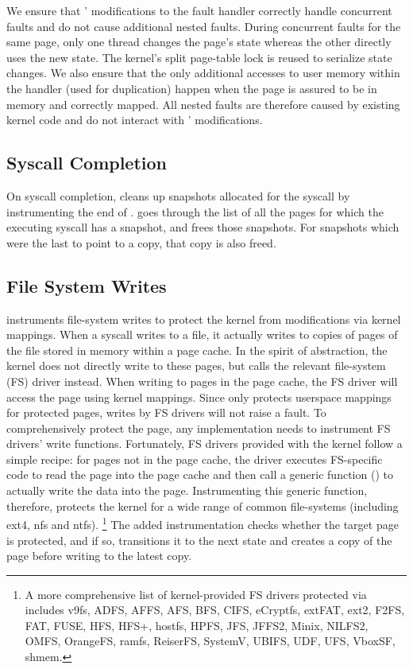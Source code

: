 \documentclass[letterpaper,twocolumn,10pt]{article}
\begin{document}
We ensure that \midas' modifications to the fault handler 
correctly handle concurrent faults and do not cause additional 
nested faults. 
During concurrent faults for the same page, only one thread 
changes the page's state whereas the other directly uses the new 
state.
The kernel's split page-table lock is reused to serialize state 
changes. 
We also ensure that the only additional accesses to user memory 
within the handler (used for duplication) happen when the page 
is assured to be in memory and correctly mapped.
All nested faults are therefore caused by existing kernel code
and do not interact with \midas' modifications.

\subsection{Syscall Completion}

On syscall completion, \midas cleans up snapshots allocated for 
the syscall by instrumenting the end of .
\midas goes through the list of all the pages for which the 
executing syscall has a snapshot, and frees those snapshots.
For snapshots which were the last to point to a copy, that 
copy is also freed.


\subsection{File System Writes}

\midas instruments file-system writes to protect the kernel
from modifications via kernel mappings.
When a  syscall writes to a file, it actually
writes to copies of pages of the file stored in memory within 
a page cache.
In the spirit of abstraction, the kernel does not directly write to 
these pages, but calls the relevant file-system (FS) driver instead.
When writing to pages in the page cache, the FS driver will access the 
page using kernel mappings.
Since \midas only protects userspace mappings for protected pages, 
writes by FS drivers will not raise a fault.
To comprehensively protect the page, any implementation needs to 
instrument FS drivers' write functions.
Fortunately, FS drivers provided with the kernel follow a simple 
recipe: for pages not in the page cache, the driver executes 
FS-specific code to read the page into the page cache and then 
call a generic function () to actually 
write the data into the page.
Instrumenting this generic function, therefore, protects the kernel
for a wide range of common file-systems (including ext4, nfs and 
ntfs). \footnote{A more comprehensive list of kernel-provided FS drivers 
protected via  includes v9fs, ADFS, AFFS, 
AFS, BFS, CIFS, eCryptfs, extFAT, ext2, F2FS,  FAT, FUSE, HFS, HFS+, 
hostfs, HPFS, JFS, JFFS2, Minix, NILFS2, OMFS, OrangeFS, ramfs, ReiserFS,
SystemV, UBIFS, UDF, UFS, VboxSF, shmem.}
The added instrumentation checks whether the target page is 
protected, and if so, transitions it to the next state and 
creates a copy of the page before writing to the latest copy.
\end{document}
